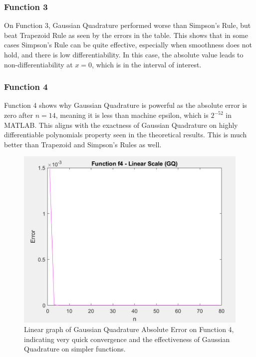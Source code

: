 \documentclass[12pt]{article}
\begin{document}
\subsubsection{Function 3}

On Function 3, Gaussian Quadrature performed worse than Simpson's Rule, but beat 
Trapezoid Rule as seen by the errors in the table. This shows that in some 
cases Simpson's Rule can be quite effective, especially when smoothness does 
not hold, and there is low differentiability. In this case, the absolute value 
leads to non-differentiability at $x = 0$, which is in the interval of interest.

\subsubsection{Function 4}

Function 4 shows why Gaussian Quadrature is powerful as the absolute error is zero after $n = 14$,
meaning it is less than machine epsilon, which is $2^{-52}$ in MATLAB. This aligns 
with the exactness of Gaussian Quadrature on highly differentiable polynomials 
property seen in the theoretical results. This is much better than Trapezoid 
and Simpson's Rules as well. 

\begin{figure}[htbp]
	\centering
	\begin{minipage}[b]{0.45\textwidth}
		\includegraphics[width=\textwidth]{../images/GQ-f4-linspace.png} %
		\caption{Linear graph of Gaussian Quadrature Absolute Error on Function 4, indicating very quick convergence and the effectiveness of Gaussian Quadrature on simpler functions.}
	\end{minipage}
\end{figure}
\end{document}
